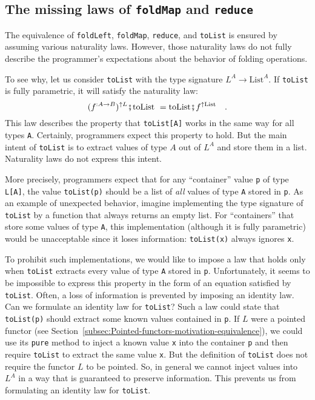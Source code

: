 \subsection{The missing laws of \texttt{foldMap} and \texttt{reduce}}

The equivalence of \lstinline!foldLeft!, \lstinline!foldMap!, \lstinline!reduce!,
and \lstinline!toList! is ensured by assuming various naturality
laws. However, those naturality laws do not fully describe the programmer\textsf{'}s
expectations about the behavior of folding operations. 

To see why, let us consider \lstinline!toList! with the type signature
$L^{A}\rightarrow\text{List}^{A}$. If \lstinline!toList! is fully
parametric, it will satisfy the naturality law:
\[
(f^{:A\rightarrow B})^{\uparrow L}\bef\text{toList }=\text{toList}\bef f^{\uparrow\text{List}}\quad.
\]
This law describes the property that \lstinline!toList[A]! works
in the same way for all types \lstinline!A!. Certainly, programmers
expect this property to hold. But the main intent of \lstinline!toList!
is to extract values of type $A$ out of $L^{A}$ and store them in
a list. Naturality laws do not express this intent.

More precisely, programmers expect that for any \textsf{``}container\textsf{''} value
\lstinline!p! of type \lstinline!L[A]!, the value \lstinline!toList(p)!
should be a list of \emph{all} values of type \lstinline!A! stored
in \lstinline!p!. As an example of unexpected behavior, imagine implementing
the type signature of \lstinline!toList! by a function that always
returns an empty list. For \textsf{``}containers\textsf{''} that store some values
of type \lstinline!A!, this implementation (although it is fully
parametric) would be unacceptable since it loses information: \lstinline!toList(x)!
always ignores  \lstinline!x!.

To prohibit such implementations, we would like to impose a law that
holds only when \lstinline!toList! extracts every value of type \lstinline!A!
stored in \lstinline!p!. Unfortunately, it seems to be impossible
to express this property in the form of an equation satisfied by \lstinline!toList!.
Often, a loss of information is prevented by imposing an identity
law. Can we formulate an identity law for \lstinline!toList!? Such
a law could state that \lstinline!toList(p)! should extract some
known values contained in \lstinline!p!. If $L$ were a pointed functor
(see Section~\ref{subsec:Pointed-functors-motivation-equivalence}),
we could use its \lstinline!pure! method to inject a known value
\lstinline!x! into the container \lstinline!p! and then require
\lstinline!toList! to extract the same value \lstinline!x!. But
the definition of \lstinline!toList! does not require the functor
$L$ to be pointed. So, in general we cannot inject values into $L^{A}$
in a way that is guaranteed to preserve information. This prevents
us from formulating an identity law for \lstinline!toList!.

